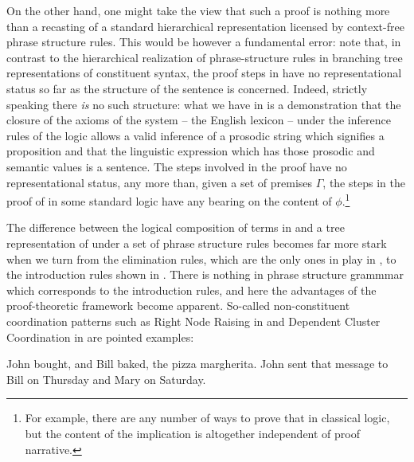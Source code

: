 \documentclass[output=paper,colorlinks,citecolor=brown]{langscibook}
\begin{document}
On the other hand, one might take the view that such a proof is
nothing more than a recasting of a standard hierarchical
representation licensed by context-free phrase structure rules. This
would be however a fundamental error: note that, in contrast to the
hierarchical realization of phrase-structure rules in branching tree
representations of constituent syntax, the proof steps in 
have no representational status so far as the structure of the
sentence is concerned. Indeed, strictly speaking there \textit{is} no
such structure: what we have in  is a demonstration that
the closure of the axioms of the system -- the English lexicon -- under
the inference rules of the logic allows a valid inference of a prosodic
string
 
which signifies a proposition
 and that the
linguistic expression which has those prosodic and semantic values is
a sentence. The steps involved in the proof have no representational
status, any more than, given a set of premises $\Gamma$, the steps in
the proof of \sem{ \Gamma  \ensuremath{\vdash\xspace } \phi } in some standard logic have any
bearing on the content of $\phi$.\footnote{For example, there are any
number of ways to prove that \sem{\ensuremath{\vdash\xspace } \phi\supset(\neg\,\phi\supset\psi)}
in classical logic, but the content of the implication is
altogether independent of proof narrative.}

The difference between the logical composition of terms in  and
a tree representation of  under a set of phrase structure rules
becomes far more stark when we turn from the elimination rules, which
are the only ones in play in , to the introduction rules
shown in . There is nothing in phrase structure grammmar which
corresponds to the introduction rules, and here the advantages of the
proof-theoretic framework become apparent. So-called non-constituent
coordination patterns such as Right Node Raising in  and
Dependent Cluster Coordination in  are pointed examples:

\begin{exe}
\ex\label{NCC}
\begin{xlist}
 \ex\label{RNR} John bought, and Bill baked, the pizza margherita.
 \ex\label{DCC} John sent that message to Bill on Thursday and Mary on Saturday.
\end{xlist}
\end{exe}
\end{document}

